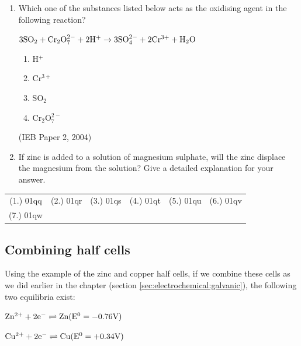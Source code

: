 {\begin{enumerate}
{	\begin{enumerate}
	\item{Which substance is the strongest oxidising agent?}
	\item{Which substance is the strongest reducing agent?}
	\end{enumerate}}

\item{Which one of the substances listed below acts as the oxidising agent in the following reaction?
\begin{center}
$\rm{3SO_{2} + Cr_{2}O_{7}^{2-} + 2H^{+} \rightarrow 3SO_{4}^{2-} + 2Cr^{3+} + H_{2}O}$
\end{center}
	\begin{enumerate}
	\item{H$^{+}$}
	\item{Cr$^{3+}$}
	\item{SO$_{2}$}
	\item{Cr$_{2}$O$_{7}^{2-}$}
	\end{enumerate}
(IEB Paper 2, 2004)
}
\item{If zinc is added to a solution of magnesium sulphate, will the zinc displace the magnesium from the solution? Give a detailed explanation for your answer.}
\end{enumerate}

\par \practiceinfo
\par \begin{tabular}[h]{cccccc}
(1.)	01qq	&
(2.)	01qr	&
(3.)	01qs	&
(4.)	01qt	&
(5.)	01qu	&
(6.)	01qv	\\ %
(7.)	01qw	&
\end{tabular}


} %


\subsection{Combining half cells}
\label{subsec:electrochemical:combining half cells}

Using the example of the zinc and copper half cells, if we combine these cells as we did earlier in the chapter (section \ref{sec:electrochemical:galvanic}), the following two equilibria exist:

\begin{center}
$\rm{Zn^{2+} + 2e^{-} \rightleftharpoons Zn (E^{0} = -0.76V)}$

$\rm{Cu^{2+} + 2e^{-} \rightleftharpoons Cu (E^{0} = +0.34V)}$
\end{center}

